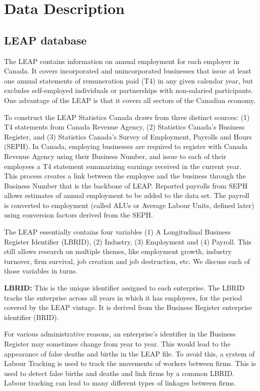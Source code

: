 \documentclass{article}
\begin{document}
\section{Data Description}

\subsection{LEAP database}

The LEAP contains information on annual employment for each employer in Canada. It covers incorporated and unincorporated businesses that issue at least one annual statements of remuneration paid (T4) in any given calendar year, but excludes self-employed individuals or partnerships with non-salaried participants. One advantage of the LEAP is that it covers all sectors of the Canadian economy.

To construct the LEAP Statistics Canada draws from three distinct sources: (1) T4 statements from Canada Revenue Agency, (2) Statistics Canada's Business Register, and (3) Statistics Canada's Survey of Employment, Payrolls and Hours (SEPH). In Canada, employing businesses are required to register with Canada Revenue Agency using their Business Number, and issue to each of their employees a T4 statement summarizing earnings received in the current year. This process creates a link between the employee and the business through the Business Number that is the backbone of LEAP. Reported payrolls from SEPH allows estimates of annual employment to be added to the data set. The payroll is converted to employment (called ALUs or Average Labour Units, defined later) using conversion factors derived from the SEPH. 

The LEAP essentially contains four variables (1) A Longitudinal Business Register Identifier (LBRID), (2) Industry, (3) Employment and (4) Payroll. This still allows research on multiple themes, like employment growth, industry turnover, firm survival, job creation and job destruction, etc. We discuss each of those variables in turns. 

\textbf{LBRID:} This is the unique identifier assigned to each enterprise.  The LBRID tracks the enterprise across all years in which it has employees, for the period covered by the LEAP vintage. It is derived from the Business Register enterprise identifier (BRID). 

For various administrative reasons, an enterprise's identifier in the Business Register may sometimes change from year to year.  This would lead to the appearance of false deaths and births in the LEAP file.  To avoid this, a system of Labour Tracking is used to track the movements of workers between firms.  This is used to detect false births and deaths and link firms by a common LBRID. Labour tracking can lead to many different types of linkages between firms. 
\end{document}
